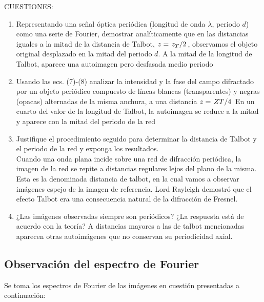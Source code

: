 \documentclass{./packages/optica-article}
\begin{document}
CUESTIONES:
\begin{enumerate}
\item Representando una señal óptica periódica (longitud de onda $\lambda$, periodo $d$) como una serie de Fourier, demostrar analíticamente que en las distancias iguales a la mitad de la distancia de Talbot, $z=\flatfrac{z_{T}}{2}$, observamos el objeto original desplazado en la mitad del periodo $d$.
A la mitad de la longitud de Talbot, aparece una autoimagen pero desfasada medio periodo
\item Usando las ecs. (7)-(8) analizar la intensidad y la fase del campo difractado por un objeto periódico compuesto de líneas blancas (transparentes) y negras (opacas) alternadas de la misma anchura, a una distancia $z=\flatfrac{ZT}{4}$
En un cuarto del valor de la longitud de Talbot, la autoimagen se reduce a la mitad y aparece con la mitad del periodo de la red
\item Justifique el procedimiento seguido para determinar la distancia de Talbot y el periodo de la red y exponga los resultados.\\
Cuando una onda plana incide sobre una red de difracción periódica, la imagen de la red se repite a distancias regulares lejos del plano de la misma. Esta es la denominada distancia de talbot, en la cual vamos a observar imágenes espejo de la imagen de referencia. Lord Rayleigh demostró que el efecto Talbot era una consecuencia natural de la difracción de Fresnel.
\item ¿Las imágenes observadas siempre son periódicos? ¿La respuesta está de acuerdo con la teoría?
A distancias mayores a las de talbot mencionadas aparecen otras autoimágenes que no conservan su periodicidad axial.
\end{enumerate}

\subsection{Observación del espectro de Fourier}
Se toma los espectros de Fourier de las imágenes en cuestión presentadas a continuación:
\end{document}

